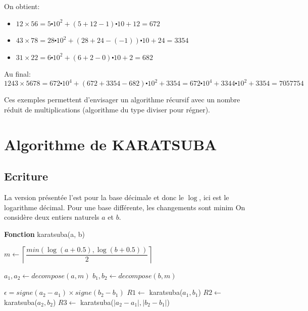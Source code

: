 \documentclass[11pt,french]{article}
\theoremstyle{plain}
\newcommand{\x}{\times}
\newcommand{\cd}{\centerdot}
\begin{document}
On obtient:
\begin{itemize}
    \item $12 \times 56 = 5\cd 10^2+\left( 5+12-1\right) \cd 10 + 12 = 672$
    \item $43 \times 78 = 28\cd 10^2+\left( 28+24-(-1) \right) \cd 10 + 24 = 3354$
    \item $31 \times 22 = 6\cd 10^2+\left( 6+2-0 \right) \cd 10 + 2 =682$
\end{itemize}

Au final:
\[  1243\x5678 = 672\cd10^4+\left( 672+3354-682\right)\cd 10^2+ 3354 =  672\cd10^4+3344\cd 10^2+ 3354= 7 057 754 \]

Ces exemples permettent d'envisager un algorithme récursif avec un nombre réduit de multiplications (algorithme du type diviser pour régner).

\section{Algorithme de KARATSUBA}

\subsection{Ecriture}

La version présentée l'est pour la base décimale et donc le $\log$, ici  est le logarithme décimal. Pour une base différente, les changements sont minim
On considère deux entiers naturels $a$ et $b$.
\begin{center}
\begin{minipage}{10cm}
   \begin{algorithm}[H]
       \caption{\textbf{Fonction} karatsuba(a, b)}
       \vspace{1em}
       
       $m  \gets  \left\lceil \dfrac{min\left( \log(a+0.5), \log(b+0.5)\right) }{2}  \right\rceil$\;
       
       $a_1,a_2 \gets decompose(a, m)$ \;
       $b_1, b_2 \gets  decompose(b, m)$ \;
       
       $\epsilon = signe(a_2-a_1)\x signe(b_2-b_1)$\;
       $R1  \gets $ karatsuba($a_1,b_1$) \;
       $R2 \gets  $ karatsuba($a_2,b_2$)\;
       $R3  \gets $ karatsuba($|a_2-a_1|,|b_2-b_1|$)\;
  
       
       \Retour{ $R1 \times 10 ^ {2\times m } + (R1+R2-\epsilon \x R3 ) \times 10 ^{ m} + R2$}
       
   \end{algorithm}
\end{minipage}
\end{center}
\end{document}
